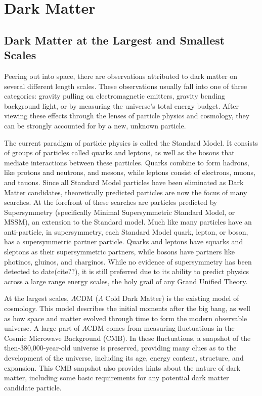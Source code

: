 \cleartooddpage[\thispagestyle{empty}]
\chapter{Dark Matter}

\section{Dark Matter at the Largest and Smallest Scales} %

Peering out into space, there are observations attributed to dark matter on several different length scales.
These observations usually fall into one of three categories: gravity pulling on electromagnetic emitters, gravity bending background light, or by measuring the universe's total energy budget.
After viewing these effects through the lenses of particle physics and cosmology, they can be strongly accounted for by a new, unknown particle.

The current paradigm of particle physics is called the Standard Model.
It consists of groups of particles called quarks and leptons, as well as the bosons that mediate interactions between these particles.
Quarks combine to form hadrons, like protons and neutrons, and mesons, while leptons consist of electrons, muons, and tauons.
Since all Standard Model particles have been eliminated as Dark Matter candidates, theoretically predicted particles are now the focus of many searches.
At the forefront of these searches are particles predicted by Supersymmetry (specifically Minimal Supersymmetric Standard Model, or MSSM), an extension to the Standard model.
Much like many particles have an anti-particle, in supersymmetry, each Standard Model quark, lepton, or boson, has a supersymmetric partner particle.
Quarks and leptons have squarks and sleptons as their supersymmetric partners, while bosons have partners like photinos, gluinos, and charginos.
While no evidence of supersymmetry has been detected to date(cite??), it is still preferred due to its ability to predict physics across a large range energy scales, the holy grail of any Grand Unified Theory.

At the largest scales, $\Lambda$CDM ($\Lambda$ Cold Dark Matter) is the existing model of cosmology.
This model describes the initial moments after the big bang, as well as how space and matter evolved through time to form the modern observable universe.
A large part of $\Lambda$CDM comes from measuring fluctuations in the Cosmic Microwave Background (CMB).
In these fluctuations, a snapshot of the then-380,000-year-old universe is preserved, providing many clues as to the development of the universe, including its age, energy content, structure, and expansion. %
This CMB snapshot also provides hints about the nature of dark matter, including some basic requirements for any potential dark matter candidate particle.


